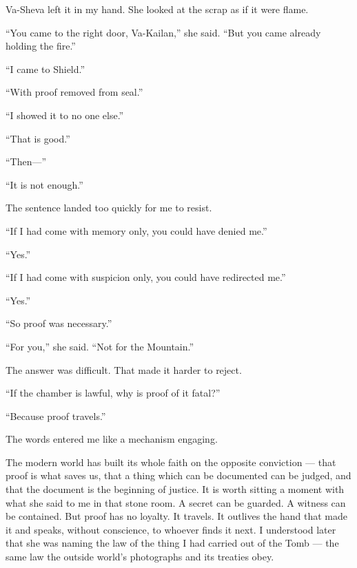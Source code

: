 Va-Sheva left it in my hand. She looked at the scrap as if it were flame.\par

``You came to the right door, Va-Kailan,'' she said. ``But you came already holding the fire.''\par

``I came to Shield.''\par

``With proof removed from seal.''\par

``I showed it to no one else.''\par

``That is good.''\par

``Then---''\par

``It is not enough.''\par

The sentence landed too quickly for me to resist.\par

``If I had come with memory only, you could have denied me.''\par

``Yes.''\par

``If I had come with suspicion only, you could have redirected me.''\par

``Yes.''\par

``So proof was necessary.''\par

``For you,'' she said. ``Not for the Mountain.''\par

The answer was difficult. That made it harder to reject.\par

``If the chamber is lawful, why is proof of it fatal?''\par

``Because proof travels.''\par

The words entered me like a mechanism engaging.\par

The modern world has built its whole faith on the opposite conviction --- that proof is what saves us, that a thing which can be documented can be judged, and that the document is the beginning of justice. It is worth sitting a moment with what she said to me in that stone room. A secret can be guarded. A witness can be contained. But proof has no loyalty. It travels. It outlives the hand that made it and speaks, without conscience, to whoever finds it next. I understood later that she was naming the law of the thing I had carried out of the Tomb --- the same law the outside world's photographs and its treaties obey.\par

